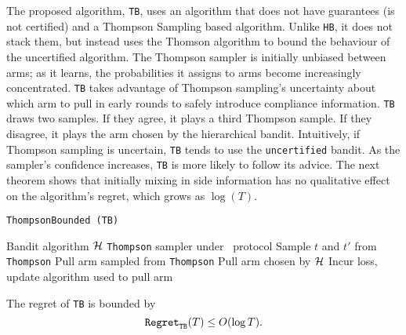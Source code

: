 The proposed algorithm, \texttt{TB}, uses an algorithm that does not have guarantees (is not certified) and a Thompson Sampling based algorithm. Unlike \texttt{HB}, it does not stack them, but instead uses the Thomson algorithm to bound the behaviour of the uncertified algorithm.%
The Thompson sampler is initially unbiased between arms; as it learns, the probabilities it assigns to arms become increasingly concentrated. \texttt{TB} takes advantage of Thompson sampling's uncertainty about which arm to pull in early rounds to safely introduce compliance information. \texttt{TB} draws two samples. If they agree, it plays a third Thompson sample. If they disagree, it plays the arm chosen by the hierarchical bandit.
Intuitively, if Thompson sampling is uncertain, \texttt{TB} tends to use the \texttt{uncertified} bandit. As the sampler's confidence increases, \texttt{TB} is more likely to follow its advice. The next theorem shows that initially mixing in side information has no qualitative effect on the algorithm's regret, which grows as $\log(T)$. 



\begin{algorithm}[tb]
   \caption{\texttt{ThompsonBounded (TB)}}
   \begin{algorithmic}   
    Bandit algorithm ${\mathcal H}$
    \texttt{Thompson} sampler under \chosen\, protocol
	\STATE Sample $t$ and $t'$ from \texttt{Thompson}
	\STATE Pull arm sampled from \texttt{Thompson}
	\ELSE
	\STATE Pull arm chosen by ${\mathcal H}$
	\ENDIF
	\STATE Incur loss, update algorithm used to pull arm
   	\ENDFOR
   	\end{algorithmic}
\end{algorithm}



\begin{thm}\label{thm:tb}
	The regret of \texttt{TB} is bounded by
	\begin{equation}
		{\mathtt{Regret}}_{\texttt{TB}}(T) \leq O(\log T).
	\end{equation}
\end{thm}

